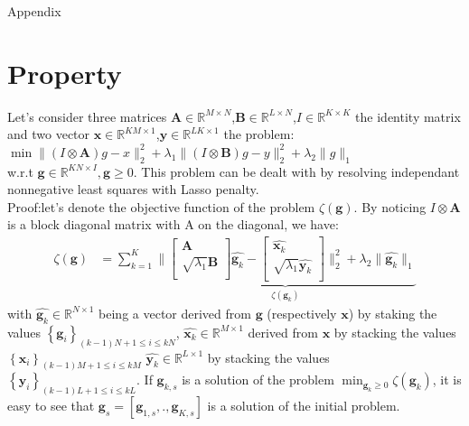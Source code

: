 \documentclass{article}
\def\A{{\mathbf A}}
\def\B{{\mathbf B}}
\def\x{{\mathbf x}}
\def\y{{\mathbf y}}
\def\g{{\mathbf g}}
\begin{document}
%
%



\appendix
\begin{center}
    \LARGE 
    Appendix
\end{center}
\section{Property}
Let's consider three matrices $\A\in \mathbb{R}^{M\times N}$,$\B\in\mathbb{R}^{L\times N}$,$I\in \mathbb{R}^{K\times K}$ the identity matrix and two  vector $\x \in \mathbb{R}^{KM\times 1}$,$\y \in \mathbb{R}^{LK\times 1}$ the problem:
\\
$\min \|(I\otimes \A)g-x\|^{2}_{2}+\lambda_{1}\|(I\otimes\B)g-y\|^{2}_{2}+\lambda_{2}\|g\|_{1}$\\
w.r.t $\g\in\mathbb{R}^{KN\times I},\g\geq 0$.%
This problem can be dealt with by resolving independant nonnegative least squares with Lasso penalty.\\
Proof:let's denote the objective function of the problem $\zeta(\g)$.
By noticing 
$I\otimes \A$ is a block diagonal matrix with A on the diagonal, we have:$$
\begin{aligned}
\zeta(\g)&=\sum^{K}_{k=1}\underbrace{\|\begin{bmatrix}
                    \A\\
                    \sqrt{\lambda_{1}}\B\\
\end{bmatrix}\widehat{\g_{k}}-\begin{bmatrix}
                    \widehat{\x_{k}}\\
                    \sqrt{\lambda_{1}}\widehat{\y_{k}}\\
\end{bmatrix}\|^{2}_{2}+\lambda_{2}\|\widehat{\g_{k}}\|_{1}}_{\zeta(\g_{k})}
\end{aligned}
$$ with $\widehat{\g_{k}}\in\mathbb{R}^{N\times1}$ being a vector derived from $\g$ (respectively $\x$) by staking the values $\left\{\g_{i}\right\}_{(k-1)N+1\leq i \leq kN}$,
$\widehat{\x_{k}}\in\mathbb{R}^{M\times1}$ derived from $\x$ by stacking the values$\left\{\x_{i}\right\}_{(k-1)M+1\leq i \leq kM}$
$\widehat{\y_{k}}\in\mathbb{R}^{L\times1}$ by stacking the values $\left\{\y_{i}\right\}_{(k-1)L+1\leq i \leq kL}$. If $\g_{k,s}$ is a solution of the problem $\min_{\g_{k}\geq 0}\zeta(\g_{k})$, it is easy to see that $\g_{s}=[\g_{1,s},.,\g_{K,s}]$ is a solution of the initial problem.
\end{document}
